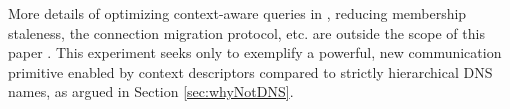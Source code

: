 More details of optimizing context-aware queries in \auspice, reducing membership staleness, the connection migration protocol, etc. are outside the scope of this paper \cite{msocketTR}. This experiment seeks only to exemplify a powerful, new communication primitive enabled by context descriptors compared to strictly hierarchical DNS names, as argued in Section \ref{sec:whyNotDNS}. 














